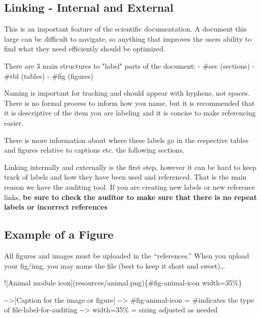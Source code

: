 \documentclass[
  letterpaper,
  oneside,
  openany]{scrbook}
\newenvironment{Shaded}{\begin{snugshade}}{\end{snugshade}}
\newcommand{\AlertTok}[1]{\textcolor[rgb]{0.68,0.00,0.00}{#1}}
\newcommand{\CommentTok}[1]{\textcolor[rgb]{0.37,0.37,0.37}{#1}}
\newcommand{\NormalTok}[1]{\textcolor[rgb]{0.00,0.23,0.31}{#1}}
\newcommand{\OtherTok}[1]{\textcolor[rgb]{0.00,0.23,0.31}{#1}}
\newcommand{\SpecialStringTok}[1]{\textcolor[rgb]{0.13,0.47,0.30}{#1}}
\begin{document}
\subsection{Linking - Internal and
External}\label{linking---internal-and-external}

This is an important feature of the scientific documentation. A document
this large can be difficult to navigate, so anything that improves the
users ability to find what they need efficiently should be optimized.

\begin{Shaded}
\begin{Highlighting}[]

\NormalTok{There are 3 main structures to "label" parts of the document: }
\SpecialStringTok{{-} }\NormalTok{\#sec (sections)}
\SpecialStringTok{{-} }\NormalTok{\#tbl (tables)}
\SpecialStringTok{{-} }\NormalTok{\#fig (figures)}

\NormalTok{Naming is important for tracking and should appear with hyphens, not spaces. There is no formal process to inform how you name, but it is recommended that it is descriptive of the item you are labeling and it is concise to make referencing easier.}

\NormalTok{There is more information about where these labels go in the respective tables and figures relative to captions etc. the following sections.}





\end{Highlighting}
\end{Shaded}

Linking internally and externally is the first step, however it can be
hard to keep track of labels and how they have been used and referenced.
That is the main reason we have the auditing tool. If you are creating
new labels or new reference links, \textbf{be sure to check the auditor
to make sure that there is no repeat labels or incorrect references}

\subsection{Example of a Figure}\label{example-of-a-figure}

All figures and images must be uploaded in the ``references.'' When you
upload your fig/img, you may name the file (best to keep it short and
sweet)\ldots{}

\begin{Shaded}
\begin{Highlighting}[]
\AlertTok{![Animal module icon](resources/animal.png)}\NormalTok{\{\#fig{-}animal{-}icon width=35\%\}}

\NormalTok{{-}{-}\textgreater{}}\CommentTok{[}\OtherTok{Caption for the image or figure}\CommentTok{]}
\NormalTok{{-}{-}\textgreater{} \#fig{-}animal{-}icon = \#indicates the type of file{-}label{-}for{-}auditing}
\NormalTok{{-}{-}\textgreater{} width=35\% = sizing adjusted as needed}
\end{Highlighting}
\end{Shaded}
\end{document}

